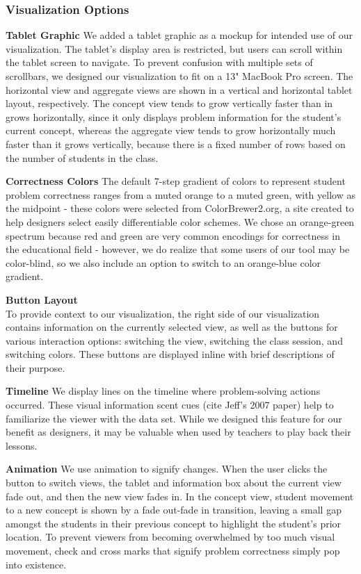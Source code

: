 \documentclass{sigchi}
\begin{document}
\subsubsection{Visualization Options}

{\bf Tablet Graphic}
We added a tablet graphic as a mockup for intended use of our visualization. The tablet's display area is restricted, but users can scroll within the tablet screen to navigate. To prevent confusion with multiple sets of scrollbars, we designed our visualization to fit on a 13" MacBook Pro screen. The horizontal view and aggregate views are shown in a vertical and horizontal tablet layout, respectively. The concept view tends to grow vertically faster than in grows horizontally, since it only displays problem information for the student's current concept, whereas the aggregate view tends to grow horizontally much faster than it grows vertically, because there is a fixed number of rows based on the number of students in the class.

{\bf Correctness Colors}
The default 7-step gradient of colors to represent student problem correctness ranges from a muted orange to a muted green, with yellow as the midpoint - these colors were selected from ColorBrewer2.org, a site created to help designers select easily differentiable color schemes. We chose an orange-green spectrum because red and green are very common encodings for correctness in the educational field - however, we do realize that some users of our tool may be color-blind, so we also include an option to switch to an orange-blue color gradient.

{\bf Button Layout}\\
To provide context to our visualization, the right side of our visualization contains information on the currently selected view, as well as the buttons for various interaction options: switching the view, switching the class session, and switching colors. These buttons are displayed inline with brief descriptions of their purpose.

{\bf Timeline}
We display lines on the timeline where problem-solving actions occurred. These visual information scent cues (cite Jeff's 2007 paper) help to familiarize the viewer with the data set. While we designed this feature for our benefit as designers, it may be valuable when used by teachers to play back their lessons.

{\bf Animation}
We use animation to signify changes. When the user clicks the button to switch views, the tablet and information box about the current view fade out, and then the new view fades in. In the concept view, student movement to a new concept is shown by a fade out-fade in transition, leaving a small gap amongst the students in their previous concept to highlight the student's prior location. To prevent viewers from becoming overwhelmed by too much visual movement, check and cross marks that signify problem correctness simply pop into existence.
\end{document}
